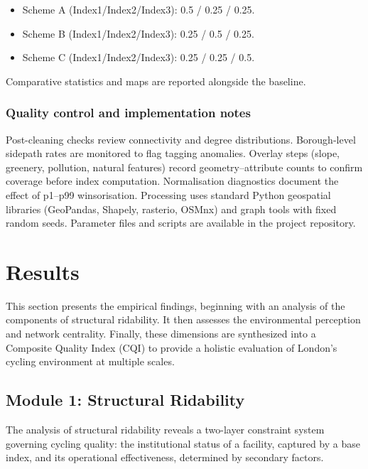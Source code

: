 \documentclass[
  12pt,
  oneside]{book}
\begin{document}
\begin{itemize}
\item
  Scheme A (Index1/Index2/Index3): 0.5 / 0.25 / 0.25.
\item
  Scheme B (Index1/Index2/Index3): 0.25 / 0.5 / 0.25.
\item
  Scheme C (Index1/Index2/Index3): 0.25 / 0.25 / 0.5.
\end{itemize}

Comparative statistics and maps are reported alongside the baseline.

\subsection{Quality control and implementation notes}\label{quality-control-and-implementation-notes}

Post-cleaning checks review connectivity and degree distributions. Borough-level sidepath rates are monitored to flag tagging anomalies. Overlay steps (slope, greenery, pollution, natural features) record geometry--attribute counts to confirm coverage before index computation. Normalisation diagnostics document the effect of p1--p99 winsorisation. Processing uses standard Python geospatial libraries (GeoPandas, Shapely, rasterio, OSMnx) and graph tools with fixed random seeds. Parameter files and scripts are available in the project repository.

\chapter{Results}\label{results}

This section presents the empirical findings, beginning with an analysis of the components of structural ridability. It then assesses the environmental perception and network centrality. Finally, these dimensions are synthesized into a Composite Quality Index (CQI) to provide a holistic evaluation of London's cycling environment at multiple scales.

\section{Module 1: Structural Ridability}\label{module-1-structural-ridability}

The analysis of structural ridability reveals a two-layer constraint system governing cycling quality: the institutional status of a facility, captured by a base index, and its operational effectiveness, determined by secondary factors.
\end{document}
